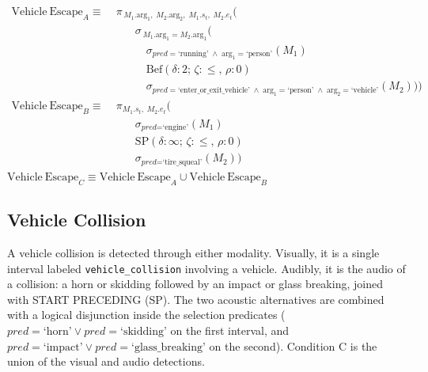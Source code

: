 \begin{flushleft}
$\begin{aligned}
\mathrm{Vehicle\ Escape}_A \equiv &\; \pi_{\,M_1.\mathrm{arg}_1,\; M_2.\mathrm{arg}_2,\; M_1.s_t,\; M_2.e_t} ( \\
&\qquad \sigma_{\,M_1.\mathrm{arg}_1 = M_2.\mathrm{arg}_1} ( \\
&\qquad\quad \sigma_{\textit{pred}=\text{`running'} \;\land\; \mathrm{arg}_1=\text{`person'}}(M_1) \\
          &\qquad\quad \mathrm{Bef}(\delta:2;\,\zeta:\le,\,\rho:0) \\
&\qquad\quad \sigma_{\textit{pred}=\text{`enter\_or\_exit\_vehicle'} \;\land\; \mathrm{arg}_1=\text{`person'} \;\land\; \mathrm{arg}_2=\text{`vehicle'}}(M_2) ) )
\end{aligned}$\\[6pt]
$\begin{aligned}
\mathrm{Vehicle\ Escape}_B \equiv &\; \pi_{M_1.s_t,\; M_2.e_t} ( \\
&\qquad \sigma_{\textit{pred}=\text{`engine'}}(M_1) \\
&\qquad \mathrm{SP}(\delta:\infty;\,\zeta:\le,\,\rho:0) \\
&\qquad \sigma_{\textit{pred}=\text{`tire\_squeal'}}(M_2) )
\end{aligned}$\\[6pt]
$\mathrm{Vehicle\ Escape}_C \equiv \mathrm{Vehicle\ Escape}_A \cup \mathrm{Vehicle\ Escape}_B$
\end{flushleft}

\subsection{Vehicle Collision}

A vehicle collision is detected through either modality. Visually, it is a single interval labeled \texttt{vehicle\_collision} involving a vehicle. Audibly, it is the audio of a collision: a horn or skidding followed by an impact or glass breaking, joined with START PRECEDING (SP). The two acoustic alternatives are combined with a logical disjunction inside the selection predicates ($\textit{pred}=\text{`horn'} \lor \textit{pred}=\text{`skidding'}$ on the first interval, and $\textit{pred}=\text{`impact'} \lor \textit{pred}=\text{`glass\_breaking'}$ on the second). Condition C is the union of the visual and audio detections.

